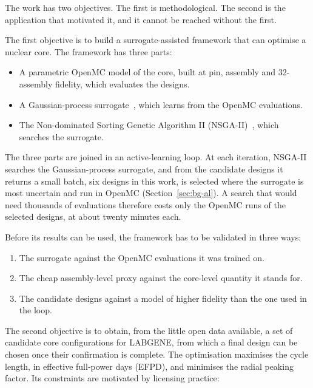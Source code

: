 The work has two objectives. The first is methodological. The second
is the application that motivated it, and it cannot be reached without
the first.

The first objective is to build a surrogate-assisted framework that can
optimise a nuclear core. The framework has three parts:

\begin{itemize}
  \item A parametric OpenMC model of the core, built at pin, assembly
        and 32-assembly fidelity, which evaluates the designs.

  \item A Gaussian-process surrogate~\cite{rasmussen_gp_2006}, which
        learns from the OpenMC evaluations.

  \item The Non-dominated Sorting Genetic Algorithm II
        (NSGA-II)~\cite{deb_nsga2_2002}, which searches the surrogate.
\end{itemize}

The three parts are joined in an active-learning loop. At each
iteration, NSGA-II searches the Gaussian-process surrogate, and from the
candidate designs it returns a small batch, six designs in this work,
is selected where the surrogate is most uncertain and run in OpenMC
(Section~\ref{sec:bg-al}). A search that would need thousands of
evaluations therefore costs only the OpenMC runs of the selected
designs, at about twenty minutes each.

Before its results can be used, the framework has to be validated in
three ways:

\begin{enumerate}
  \item The surrogate against the OpenMC evaluations it was trained on.

  \item The cheap assembly-level proxy against the core-level quantity
        it stands for.

  \item The candidate designs against a model of higher fidelity than
        the one used in the loop.
\end{enumerate}

The second objective is to obtain, from the little open data available,
a set of candidate core configurations for LABGENE, from which a final
design can be chosen once their confirmation is complete. The optimisation maximises the
cycle length, in effective full-power days (EFPD), and minimises the
radial peaking factor. Its constraints are motivated by licensing
practice:

